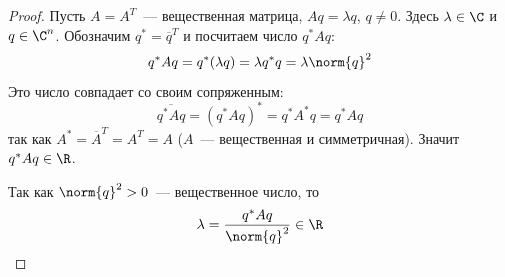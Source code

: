

\begin{proof}
  Пусть $A = A^T$~--- вещественная матрица, $Aq = \lambda q$, $q \ne 0$. Здесь $\lambda \in \C$ и $q \in \C^n$.
  Обозначим $q^* = \overline{q}^T$ и посчитаем число $q^* A q$:
  \[
  q^* A q = q^* (\lambda q) = \lambda q^* q = \lambda \norm{q}^2
  \]
  Это число совпадает со своим сопряженным:
  \[
  \overline{q^* A q} = (q^* A q)^* = q^* A^* q = q^* A q
  \]
  так как $A^* = \overline{A}^T = A^T = A$ ($A$~--- вещественная и симметричная). Значит $q^* A q \in \R$.

  Так как $\norm{q}^2 > 0$~--- вещественное число, то
  \[
  \lambda = \frac{q^* A q}{\norm{q}^2} \in \R
  \]
\end{proof}
